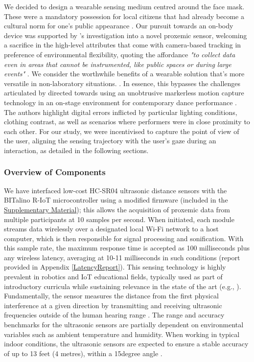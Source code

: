 We decided to design a wearable sensing medium centred around the face mask. These were a mandatory possession for local citizens that had already become a cultural norm for one’s public appearance \citep{cdc_covid-19_2021}. Our pursuit towards an on-body device was supported by \citeauthor{montanari_measuring_2018}'s investigation into a novel proxemic sensor, welcoming a sacrifice in the high-level attributes that come with camera-based tracking in preference of environmental flexibility, quoting the affordance \textit{"to collect data even in areas that cannot be instrumented, like public spaces or during large events"} \cite{montanari_measuring_2018}. We consider the worthwhile benefits of a wearable solution that's more versatile in non-laboratory situations. \citep{hale_are_2020,solberg_group_2019,hamilton_seeing_2018}. In essence, this bypasses the challenges articulated by \citeauthor{jurgens_designing_2020} directed towards using an unobtrusive markerless motion capture technology in an on-stage environment for contemporary dance performance \cite{jurgens_designing_2020}. The authors highlight digital errors inflicted by particular lighting conditions, clothing contrast, as well as scenarios where performers were in close proximity to each other. For our study, we were incentivised to capture the point of view of the user, aligning the sensing trajectory with the user's gaze during an interaction, as detailed in the following sections.

\subsubsection{Overview of Components}

We have interfaced low-cost HC-SR04 ultrasonic distance sensors with the BITalino R-IoT microcontroller using a modified firmware (included in the \hyperref[SupplementaryMaterial]{Supplementary Material}); this allows the acquisition of proxemic data from multiple participants at 10 samples per second. When initiated, each module streams data wirelessly over a designated local Wi-Fi network to a host computer, which is then responsible for signal processing and sonification. With this sample rate, the maximum response time is accepted as 100 milliseconds plus any wireless latency, averaging at 10-11 milliseconds in such conditions (report provided in Appendix \ref{LatencyReport}). This sensing technology is highly prevalent in robotics and IoT educational fields, typically used as part of introductory curricula \citep{hernandez-barrera_teaching_2014,garcia-ruiz_integrating_2018} while sustaining relevance in the state of the art (e.g., \cite{eguchi_proto-chair_2020,xu_analyzing_2018}). Fundamentally, the sensor measures the distance from the first physical interference at a given direction by transmitting and receiving ultrasonic frequencies outside of the human hearing range \citep{pal_distance_2015}. The range and accuracy benchmarks for the ultrasonic sensors are partially dependent on environmental variables such as ambient temperature and humidity. When working in typical indoor conditions, the ultrasonic sensors are expected to ensure a stable accuracy of up to 13 feet (4 metres), within a 15\degree degree angle \cite{abreu_low-cost_2021}.

